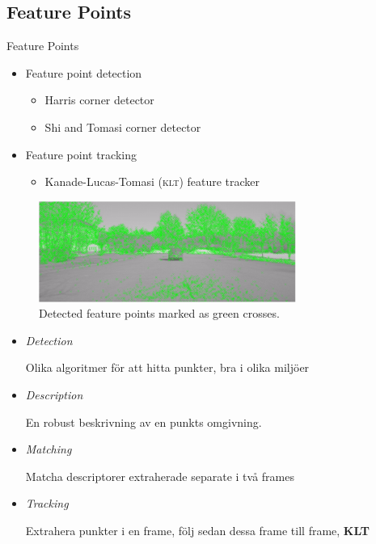 \documentclass{beamer}
\newcommand{\klt}{\textsc{klt}\xspace}
\renewcommand{\a}{\r{a}\xspace}
\renewcommand{\o}{\"o\xspace}
\begin{document}
\subsection{Feature Points}

\begin{frame}{Feature Points}
	\begin{itemize}
		\item Feature point detection
		\begin{itemize}
			\item Harris corner detector
			\item Shi and Tomasi corner detector
		\end{itemize}
		\item Feature point tracking
		\begin{itemize}
			\item Kanade-Lucas-Tomasi (\klt) feature tracker
		\end{itemize}
	\end{itemize}
	\vspace{-1em}
	\begin{figure}
		\centering
		\includegraphics[width=0.75\textwidth]{harris_features}
		\caption{\label{fig:featurepointexample} Detected feature points marked as green crosses.}
	\end{figure}

	\note
	{
		\begin{itemize}
			\item \textit{Detection}

			Olika algoritmer f\o{}r att hitta punkter, bra i olika milj\o{}er

			\item \textit{Description}

			En robust beskrivning av en punkts omgivning.

			\item \textit{Matching}

			Matcha descriptorer extraherade separate i tv\a frames

			\item \textit{Tracking}

			Extrahera punkter i en frame, f\o{}lj sedan dessa frame till frame, \textbf{KLT}
		\end{itemize}
	}
\end{frame}
\end{document}
